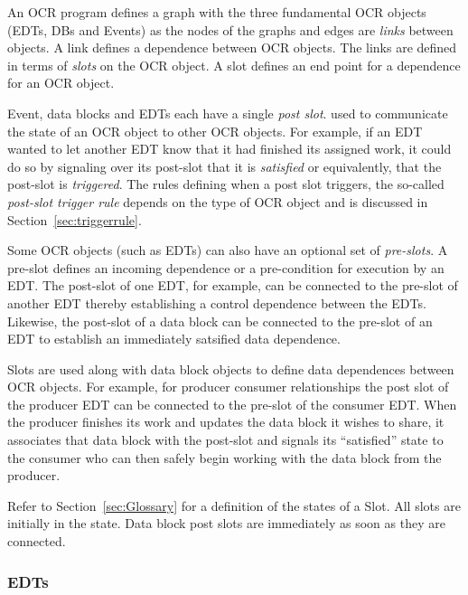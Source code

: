 An OCR program defines a graph with the three fundamental OCR objects
(EDTs, DBs and Events) as the nodes of the graphs and edges are
\emph{links} between objects. A link defines a dependence
between OCR objects. The links are defined in terms of
\emph{slots} on the OCR object. A slot defines an end
point for a dependence for an OCR object.

Event, data blocks and EDTs each have a single \emph{post
slot}.  used to communicate the state of an OCR
object to other OCR objects. For example, if an EDT wanted to let
another EDT know that it had finished its assigned work, it could do
so by signaling over its post-slot that it is \emph{satisfied} or
equivalently, that the post-slot is \emph{triggered}. The rules
defining when a post slot triggers, the so-called \emph{post-slot
trigger rule} depends on the type of OCR
object and is discussed in Section~\ref{sec:triggerrule}.

Some OCR objects (such as EDTs) can also have an optional set of
\emph{pre-slots}. A pre-slot defines an incoming
dependence or a pre-condition for execution by an EDT. The post-slot
of one EDT, for example, can be connected to the pre-slot of another
EDT thereby establishing a control dependence between the EDTs. Likewise,
the post-slot of a data block can be connected to the pre-slot of an EDT
to establish an immediately satsified data dependence.

Slots are used along with data block objects to define data
dependences between OCR objects. For example,
for producer consumer relationships the post slot of the producer EDT can be connected to
the pre-slot of the consumer EDT. When the producer finishes its work
and updates the data block it wishes to share, it associates that data
block with the post-slot and signals its ``satisfied'' state to the
consumer who can then safely begin working with the data block from
the producer.

Refer to Section~\ref{sec:Glossary} for a definition of the states of
a Slot. All slots are initially in the  state. Data
block post slots are immediately  as soon as they are
connected.
\subsubsection{EDTs}
\label{sec:EDT}

